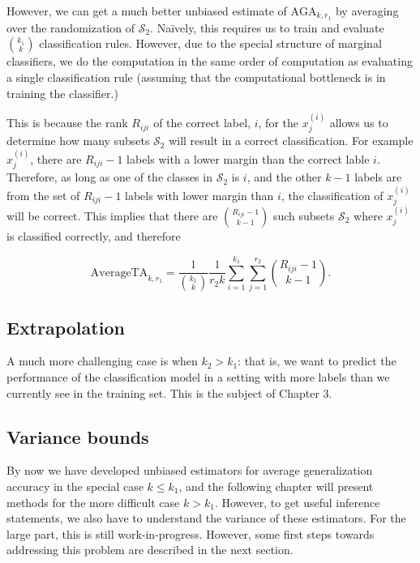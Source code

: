 However, we can get a much better unbiased estimate of
$\text{AGA}_{k, r_1}$ by averaging over the randomization of
$\mathcal{S}_2$.  Na\"{i}vely, this requires us to train and evaluate
${k_1}\choose{k}$ classification rules.  However, due to the special
structure of marginal classifiers, we do the computation in the same
order of computation as evaluating a single classification rule
(assuming that the computational bottleneck is in training the
classifier.)

This is because the rank $R_{iji}$ of the correct label, $i$, for the
$x_j^{(i)}$ allows us to determine how many subsets $\mathcal{S}_2$
will result in a correct classification.  For example $x_j^{(i)}$,
there are $R_{iji} - 1$ labels with a lower margin than the correct
lable $i$.  Therefore, as long as one of the classes in
$\mathcal{S}_2$ is $i$, and the other $k-1$ labels are from the set of
$R_{iji}-1$ labels with lower margin than $i$, the classification of
$x_j^{(i)}$ will be correct.  This implies that there are
${R_{iji}-1}\choose{k-1}$ such subsets $\mathcal{S}_2$ where
$x_j^{(i)}$ is classified correctly, and therefore

\begin{equation}\label{eq:avtestrisk}
\text{AverageTA}_{k, r_1} = \frac{1}{{{k_1}\choose{k}}}\frac{1}{r_2 k} \sum_{i=1}^{k_1} \sum_{j=1}^{r_2} {{R_{iji}-1}\choose{k-1}}.
\end{equation}

\subsection{Extrapolation}

A much more challenging case is when $k_2 > k_1$: that is, we want to
predict the performance of the classification model in a setting with
more labels than we currently see in the training set.  This is the
subject of Chapter 3.

\subsection{Variance bounds}

By now we have developed unbiased estimators for average generalization accuracy in the
special case $k \leq k_1$, and the following chapter will present
methods for the more difficult case $k > k_1$.  However, to get useful
inference statements, we also have to understand the variance of these
estimators.  For the large part, this is still work-in-progress.
However, some first steps towards addressing this problem are
described in the next section.

